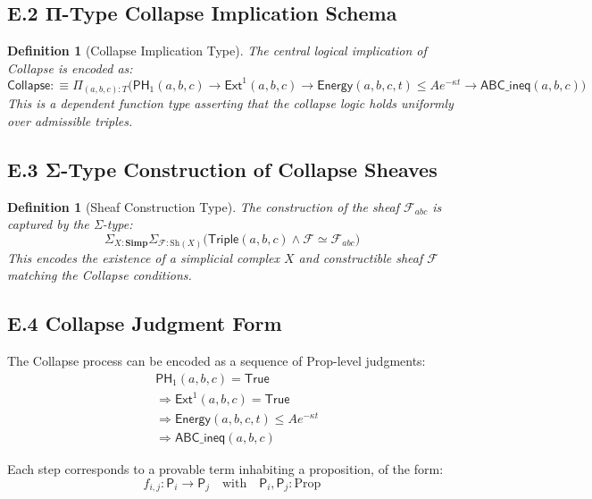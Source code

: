 \documentclass[11pt]{article}
\newtheorem{definition}[theorem]{Definition}
\begin{document}
\subsection*{E.2 Π-Type Collapse Implication Schema}

\begin{definition}[Collapse Implication Type]
The central logical implication of Collapse is encoded as:
\[
\mathsf{Collapse} :\equiv \Pi_{(a,b,c):T} \Big( \mathsf{PH}_1(a,b,c) \to \mathsf{Ext}^1(a,b,c) \to 
\mathsf{Energy}(a,b,c,t) \leq A e^{-\kappa t} \to \mathsf{ABC\_ineq}(a,b,c) \Big)
\]
This is a dependent function type asserting that the collapse logic holds uniformly over admissible triples.
\end{definition}

\subsection*{E.3 Σ-Type Construction of Collapse Sheaves}

\begin{definition}[Sheaf Construction Type]
The construction of the sheaf \( \mathcal{F}_{abc} \) is captured by the Σ-type:
\[
\Sigma_{X: \mathbf{Simp}} \Sigma_{\mathcal{F}: \mathrm{Sh}(X)} \Big( \mathsf{Triple}(a,b,c) \land \mathcal{F} \simeq \mathcal{F}_{abc} \Big)
\]
This encodes the existence of a simplicial complex \( X \) and constructible sheaf \( \mathcal{F} \) matching the Collapse conditions.
\end{definition}

\subsection*{E.4 Collapse Judgment Form}

The Collapse process can be encoded as a sequence of Prop-level judgments:
\[
\begin{aligned}
& \mathsf{PH}_1(a,b,c) = \mathsf{True} \\
& \Rightarrow \mathsf{Ext}^1(a,b,c) = \mathsf{True} \\
& \Rightarrow \mathsf{Energy}(a,b,c,t) \leq A e^{-\kappa t} \\
& \Rightarrow \mathsf{ABC\_ineq}(a,b,c)
\end{aligned}
\]

Each step corresponds to a provable term inhabiting a proposition, of the form:
\[
f_{i,j} : \mathsf{P}_i \to \mathsf{P}_j
\quad \text{with} \quad \mathsf{P}_i, \mathsf{P}_j : \mathrm{Prop}
\]
\end{document}
